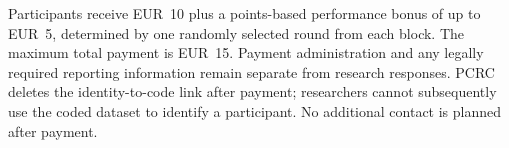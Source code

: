 Participants receive EUR~10 plus a points-based performance bonus of up to EUR~5, determined by one randomly selected round from each block. The maximum total payment is EUR~15. Payment administration and any legally required reporting information remain separate from research responses. PCRC deletes the identity-to-code link after payment; researchers cannot subsequently use the coded dataset to identify a participant. No additional contact is planned after payment.



